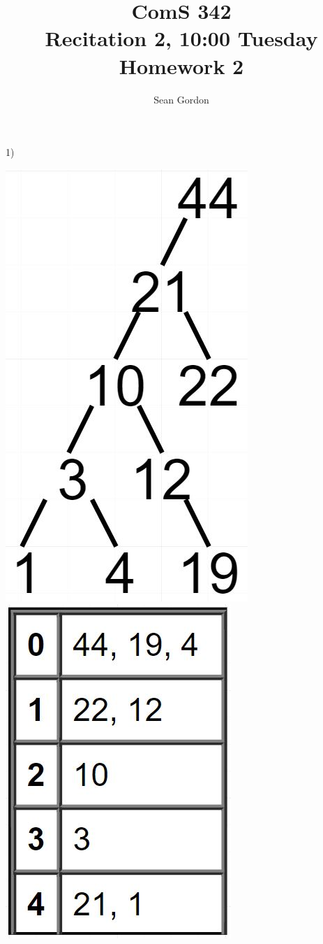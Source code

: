 \documentclass[12pt]{article}
\title{ComS 342\\Recitation 2, 10:00 Tuesday\\Homework 2}
\author{Sean Gordon}
\begin{document}
\maketitle


1)\begin{multicols}{2}
\includegraphics[scale=.4]{HW2_Pt1a}\\
\columnbreak
\includegraphics[scale=.5]{HW2_Pt1b}\\
\end{multicols} 
\end{document}
